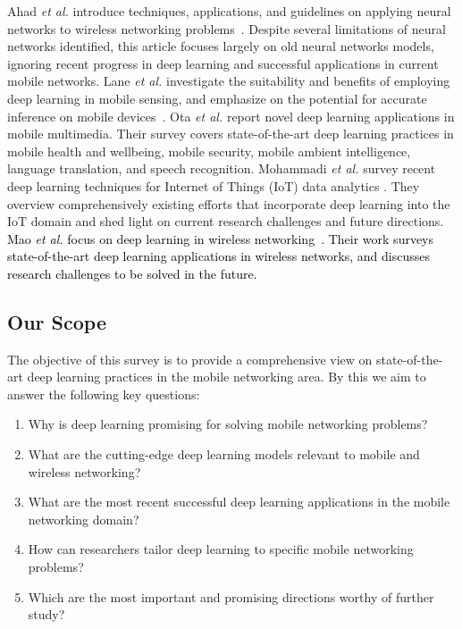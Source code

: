 \documentclass[journal,comsoc,letter]{IEEEtran}
\newcommand{\edit}[1]{\textcolor{black}{#1}}
\begin{document}
Ahad \emph{et al.} introduce techniques, applications, and guidelines on applying neural networks to wireless networking problems~\cite{ahad2016neural}. Despite several limitations of neural networks identified, this article focuses largely on old neural networks models, ignoring recent progress in deep learning and successful applications in current mobile networks. 
Lane \emph{et al.} investigate the suitability and benefits of employing deep learning in mobile sensing, and emphasize on the potential for accurate inference on mobile devices~\cite{lane2015can}.
Ota \emph{et al.} report novel deep learning applications in mobile multimedia. Their survey covers state-of-the-art deep learning practices in mobile health and wellbeing, mobile security, mobile ambient intelligence, language translation, and speech recognition. Mohammadi \emph{et al.} survey recent deep learning techniques for Internet of Things (IoT) data analytics \cite{mohammadi2018deep}. They overview comprehensively existing efforts that incorporate deep learning into the IoT domain and shed light on current research challenges and future directions. \edit{Mao \emph{et al.} focus on deep learning in wireless networking~\cite{mao2018deep}. Their work surveys state-of-the-art deep learning applications in wireless networks, and discusses research challenges to be solved in the future.}

\subsection{Our Scope}
The objective of this survey is to provide a comprehensive view on state-of-the-art deep learning practices in the mobile networking area. By this we aim to answer the following key questions: 
\begin{enumerate}
\item Why is deep learning promising for solving mobile networking problems? 
\item What are the cutting-edge deep learning models relevant to mobile and wireless networking?
\item What are the most recent successful deep learning applications in the mobile networking domain?
\item How can researchers tailor deep learning to specific mobile networking problems?
\item Which are the most important and promising directions worthy of further study?
\end{enumerate}
\end{document}
